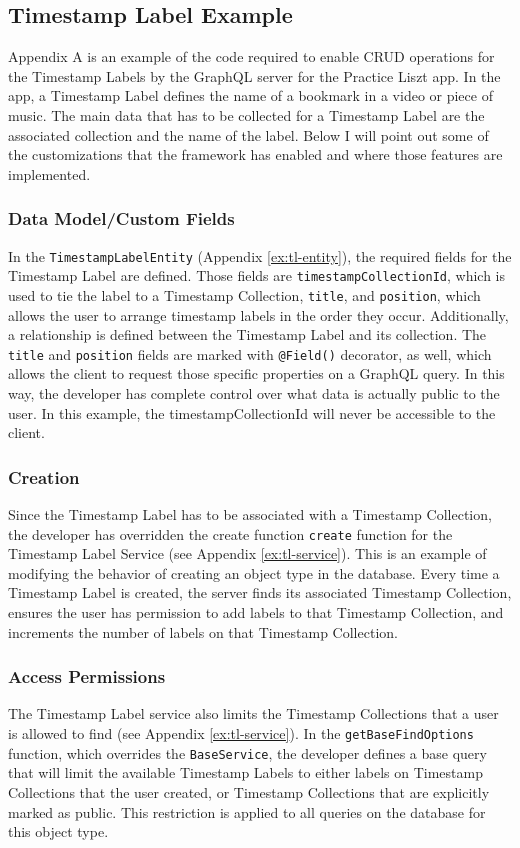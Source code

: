 \subsection{Timestamp Label Example}
Appendix A is an example of the code required to enable CRUD operations for the Timestamp Labels by the GraphQL server for the Practice Liszt app.  In the app, a Timestamp Label defines the name of a bookmark in a video or piece of music.  The main data that has to be collected for a Timestamp Label are the associated collection and the name of the label.  Below I will point out some of the customizations that the framework has enabled and where those features are implemented.

\subsubsection{Data Model/Custom Fields}
In the \verb!TimestampLabelEntity! (Appendix \ref{ex:tl-entity}), the required fields for the Timestamp Label are defined.  Those fields are \verb!timestampCollectionId!, which is used to tie the label to a Timestamp Collection, \verb!title!, and \verb!position!, which allows the user to arrange timestamp labels in the order they occur.  Additionally, a relationship is defined between the Timestamp Label and its collection.  The \verb!title! and \verb!position! fields are marked with \verb!@Field()! decorator, as well, which allows the client to request those specific properties on a GraphQL query.  In this way, the developer has complete control over what data is actually public to the user.  In this example, the timestampCollectionId will never be accessible to the client.

\subsubsection{Creation}
Since the Timestamp Label has to be associated with a Timestamp Collection, the developer has overridden the create function \verb!create! function for the Timestamp Label Service (see Appendix \ref{ex:tl-service}). This is an example of modifying the behavior of creating an object type in the database.  Every time a Timestamp Label is created, the server finds its associated Timestamp Collection, ensures the user has permission to add labels to that Timestamp Collection, and increments the number of labels on that Timestamp Collection.

\subsubsection{Access Permissions}
The Timestamp Label service also limits the Timestamp Collections that a user is allowed to find (see Appendix \ref{ex:tl-service}).  In the \verb!getBaseFindOptions! function, which overrides the \verb!BaseService!, the developer defines a base query that will limit the available Timestamp Labels to either labels on Timestamp Collections that the user created, or Timestamp Collections that are explicitly marked as public.  This restriction is applied to all queries on the database for this object type.

